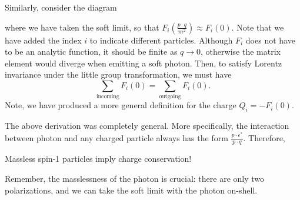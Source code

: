 \documentclass[11pt]{article}
\theoremstyle{definition}
\begin{document}
Similarly, consider the diagram

\begin{center}
\end{center}
where we have taken the soft limit, so that $F_i\left(\frac{p\cdot q}{m^2}\right) \approx F_i(0)$. Note that we have added the index $i$ to indicate different particles. Although $F_i$ does not have to be an analytic function, it should be finite as $q \rightarrow 0$, otherwise the matrix element would diverge when emitting a soft photon. Then, to satisfy Lorentz invariance under the little group transformation, we must have
\begin{equation}
    \sum_\text{incoming}F_i(0) = \sum_\text{outgoing}F_i(0).
\end{equation}
Note, we have produced a more general definition for the charge $Q_i=-F_i(0)$.

The above derivation was completely general. More specifically, the interaction between photon and any charged particle always has the form $\frac{p \cdot \epsilon^*}{p \cdot q}$. Therefore,
\begin{center}
\begin{shaded}
        Massless spin-1 particles imply charge conservation!
\end{shaded}
\end{center}
Remember, the masslessness of the photon is crucial: there are only two polarizations, and we can take the soft limit with the photon on-shell.
\end{document}
